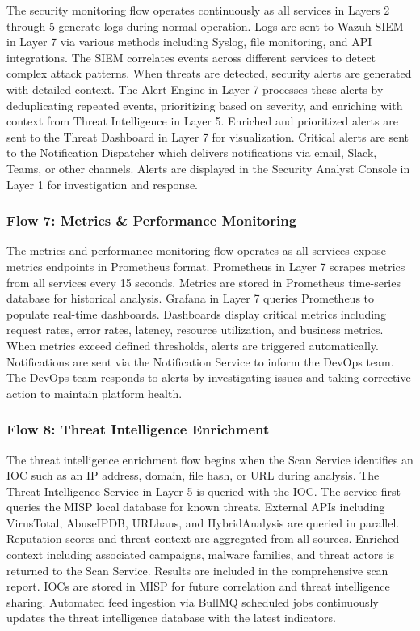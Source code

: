 \documentclass[12pt,a4paper]{report}
\begin{document}
The security monitoring flow operates continuously as all services in Layers 2 through 5 generate logs during normal operation. Logs are sent to Wazuh SIEM in Layer 7 via various methods including Syslog, file monitoring, and API integrations. The SIEM correlates events across different services to detect complex attack patterns. When threats are detected, security alerts are generated with detailed context. The Alert Engine in Layer 7 processes these alerts by deduplicating repeated events, prioritizing based on severity, and enriching with context from Threat Intelligence in Layer 5. Enriched and prioritized alerts are sent to the Threat Dashboard in Layer 7 for visualization. Critical alerts are sent to the Notification Dispatcher which delivers notifications via email, Slack, Teams, or other channels. Alerts are displayed in the Security Analyst Console in Layer 1 for investigation and response.

\subsubsection{Flow 7: Metrics \& Performance Monitoring}

The metrics and performance monitoring flow operates as all services expose metrics endpoints in Prometheus format. Prometheus in Layer 7 scrapes metrics from all services every 15 seconds. Metrics are stored in Prometheus time-series database for historical analysis. Grafana in Layer 7 queries Prometheus to populate real-time dashboards. Dashboards display critical metrics including request rates, error rates, latency, resource utilization, and business metrics. When metrics exceed defined thresholds, alerts are triggered automatically. Notifications are sent via the Notification Service to inform the DevOps team. The DevOps team responds to alerts by investigating issues and taking corrective action to maintain platform health.

\subsubsection{Flow 8: Threat Intelligence Enrichment}

The threat intelligence enrichment flow begins when the Scan Service identifies an IOC such as an IP address, domain, file hash, or URL during analysis. The Threat Intelligence Service in Layer 5 is queried with the IOC. The service first queries the MISP local database for known threats. External APIs including VirusTotal, AbuseIPDB, URLhaus, and HybridAnalysis are queried in parallel. Reputation scores and threat context are aggregated from all sources. Enriched context including associated campaigns, malware families, and threat actors is returned to the Scan Service. Results are included in the comprehensive scan report. IOCs are stored in MISP for future correlation and threat intelligence sharing. Automated feed ingestion via BullMQ scheduled jobs continuously updates the threat intelligence database with the latest indicators.
\end{document}
